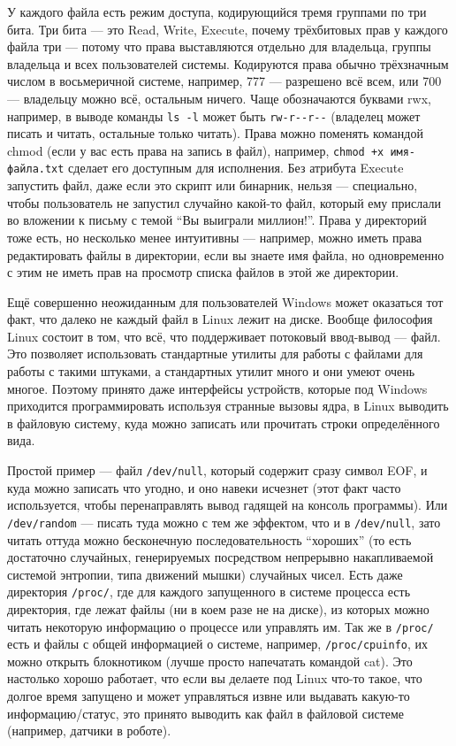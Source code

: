 \documentclass{../../text-style}
\begin{document}
У каждого файла есть режим доступа, кодирующийся тремя группами по три бита.
Три бита --- это Read, Write, Execute, почему трёхбитовых прав у каждого файла три --- потому что права выставляются отдельно для владельца, группы владельца и всех пользователей системы.
Кодируются права обычно трёхзначным числом в восьмеричной системе, например, 777 --- разрешено всё всем, или 700 --- владельцу можно всё, остальным ничего.
Чаще обозначаются буквами rwx, например, в выводе команды \verb|ls -l| может быть \verb|rw-r--r--| (владелец может писать и читать, остальные только читать).
Права можно поменять командой chmod (если у вас есть права на запись в файл), например, \verb|chmod +x имя-файла.txt| сделает его доступным для исполнения.
Без атрибута Execute запустить файл, даже если это скрипт или бинарник, нельзя --- специально, чтобы пользователь не запустил случайно какой-то файл, который ему прислали во вложении к письму с темой \enquote{Вы выиграли миллион!}.
Права у директорий тоже есть, но несколько менее интуитивны --- например, можно иметь права редактировать файлы в директории, если вы знаете имя файла, но одновременно с этим не иметь прав на просмотр списка файлов в этой же директории.

Ещё совершенно неожиданным для пользователей Windows может оказаться тот факт, что далеко не каждый файл в Linux лежит на диске.
Вообще философия Linux состоит в том, что всё, что поддерживает потоковый ввод-вывод --- файл.
Это позволяет использовать стандартные утилиты для работы с файлами для работы с такими штуками, а стандартных утилит много и они умеют очень многое.
Поэтому принято даже интерфейсы устройств, которые под Windows приходится программировать используя странные вызовы ядра, в Linux выводить в файловую систему, куда можно записать или прочитать строки определённого вида.

Простой пример --- файл \verb|/dev/null|, который содержит сразу символ EOF, и куда можно записать что угодно, и оно навеки исчезнет (этот факт часто используется, чтобы перенаправлять вывод гадящей на консоль программы).
Или \verb|/dev/random| --- писать туда можно с тем же эффектом, что и в \verb|/dev/null|, зато читать оттуда можно бесконечную последовательность \enquote{хороших} (то есть достаточно случайных, генерируемых посредством непрерывно накапливаемой системой энтропии, типа движений мышки) случайных чисел.
Есть даже директория \verb|/proc/|, где для каждого запущенного в системе процесса есть директория, где лежат файлы (ни в коем разе не на диске), из которых можно читать некоторую информацию о процессе или управлять им.
Так же в \verb|/proc/| есть и файлы с общей информацией о системе, например, \verb|/proc/cpuinfo|, их можно открыть блокнотиком (лучше просто напечатать командой cat).
Это настолько хорошо работает, что если вы делаете под Linux что-то такое, что долгое время запущено и может управляться извне или выдавать какую-то информацию/статус, это принято выводить как файл в файловой системе (например, датчики в роботе).
\end{document}
